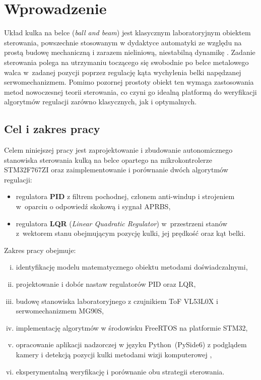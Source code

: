 
\chapter{Wprowadzenie}

Układ kulka na belce (\textit{ball and beam}) jest klasycznym laboratoryjnym obiektem sterowania,
powszechnie stosowanym w dydaktyce automatyki ze względu na prostą budowę mechaniczną
i zarazem nieliniową, niestabilną dynamikę \cite{bolivar2014modelling}.
Zadanie sterowania polega na utrzymaniu toczącego się swobodnie po belce metalowego walca
w~zadanej pozycji poprzez regulację kąta wychylenia belki napędzanej serwomechanizmem.
Pomimo pozornej prostoty obiekt ten wymaga zastosowania metod nowoczesnej teorii sterowania,
co czyni go idealną platformą do weryfikacji algorytmów regulacji zarówno klasycznych, jak i optymalnych.

\section{Cel i zakres pracy}

Celem niniejszej pracy jest zaprojektowanie i zbudowanie autonomicznego stanowiska
sterowania kulką na belce opartego na mikrokontrolerze STM32F767ZI \cite{stm32f767zi}
oraz zaimplementowanie i porównanie dwóch algorytmów regulacji:
\begin{itemize}
  \item regulatora \textbf{PID} z filtrem pochodnej, członem anti-windup i strojeniem
        w~oparciu o odpowiedź skokową i sygnał APRBS,
  \item regulatora \textbf{LQR} (\textit{Linear Quadratic Regulator}) w~przestrzeni stanów
        z~wektorem stanu obejmującym pozycję kulki, jej prędkość oraz kąt belki.
\end{itemize}

Zakres pracy obejmuje:
\begin{enumerate}[(i)]
  \item identyfikację modelu matematycznego obiektu metodami doświadczalnymi,
  \item projektowanie i dobór nastaw regulatorów PID oraz LQR,
  \item budowę stanowiska laboratoryjnego z czujnikiem ToF VL53L0X \cite{vl53l0x}
        i serwomechanizmem MG90S,
  \item implementację algorytmów w środowisku FreeRTOS na platformie STM32,
  \item opracowanie aplikacji nadzorczej w języku Python~(PySide6) z podglądem
        kamery i detekcją pozycji kulki metodami wizji komputerowej \cite{kadam2024object},
  \item eksperymentalną weryfikację i porównanie obu strategii sterowania.
\end{enumerate}


